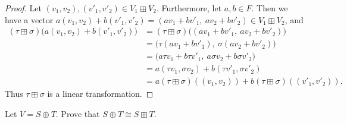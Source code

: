\begin{proof}
    Let $(v_1, v_2), (v'_1, v'_2) \in V_1 \boxplus V_2$.
    Furthermore, let $a, b \in F$.
    Then we have a vector $a(v_1, v_2) + b(v'_1, v'_2) = (av_1 + bv'_1,\ av_2 + bv'_2) \in V_1 \boxplus V_2$, and
    \begin{align*}
        (\tau \boxplus \sigma)\big(a(v_1, v_2) + b(v'_1, v'_2)\big)
            &= (\tau \boxplus \sigma)\big((av_1 + bv'_1,\ av_2 + bv'_2)\big) \\
            &= \big(\tau(av_1 + bv'_1),\ \sigma(av_2 + bv'_2)\big) \\
            &= \big(a\tau v_1 + b\tau v'_1,\ a\sigma v_2 + b\sigma v'_2\big) \\
            &= a(\tau v_1, \sigma v_2) + b(\tau v'_1, \sigma v'_2) \\
            &= a(\tau \boxplus \sigma)((v_1, v_2)) + b(\tau \boxplus \sigma)((v'_1, v'_2)).
    \end{align*}
    Thus $\tau \boxplus \sigma$ is a linear transformation.
\end{proof}

\begin{tcolorbox}[title=Problem 5, breakable]
    Let $V = S \oplus T$. Prove that $S \oplus T \cong S \boxplus T$.
\end{tcolorbox}

